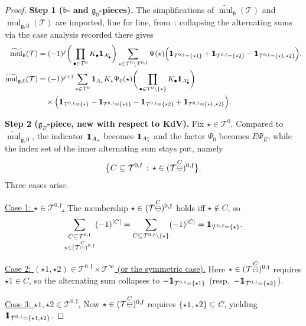 \documentclass[a4paper,
11pt,  reqno]{amsart}
\makeatletter
\newcommand{\mathbbm}[1]{\mathchoice%
    {\hbox{\sffamily 1\kern-.40em 1}}%
    {\hbox{\sffamily 1\kern-.40em 1}}%
    {\hbox{\scriptsize\sffamily 1\kern-.30em 1}}%
    {\hbox{\tiny\sffamily 1\kern-.25em 1}}}%
\newcommand{\5}{\textup{V}}
\newcommand{\ind}{\mathbbm 1}
\newcommand{\wt}{\widetilde}
\theoremstyle{remark}
\newcommand{\bul}{\bullet}
\newcommand{\TT}{\mathcal{T}}
\newcommand{\bfrak}{\mathfrak{b}}
\newcommand{\gfrak}{\mathfrak{g}}
\newcommand{\ff}{\mathfrak{f}}
\DeclareMathOperator{\mul}{mul}
\def\<#1>{\csname MH@symb@#1\endcsname}
\numberwithin{equation}{section}
\numberwithin{theorem}{section}
\makeatother
\begin{document}
\begin{proof}
\noindent\textbf{Step 1 ($\bfrak$- and $\gfrak_0$-pieces).}
The simplifications of $\wt{\mul}_\bfrak(\TT)$ and $\wt{\mul}_{\gfrak,0}(\TT)$ are imported, line for line, from~\cite[Lemma~2.10, Steps~1--2]{chcora}: collapsing the alternating sums via the case analysis recorded there gives
\begin{align}
\label{eq:mulb-nv}
\wt{\mul}_{\bfrak}(\TT) &=(-1)^j \bigg(\prod_{\bul\in \TT^0}K_\bul\ind_{A_\bul^c}\bigg) \sum_{\star\in \TT^0\setminus \TT^{0,\ff}} \Psi(\star)
\Big( \ind_{\TT^{0,\ff}=\{\star1\}} + \ind_{\TT^{0,\ff}=\{\star2\}} - \ind_{\TT^{0,\ff}=\{\star1,\star2\}}\Big),\\
\label{eq:mulg0-nv}
\wt{\mul}_{\gfrak,0}(\TT)
&= (-1)^{j+1} \sum_{\star\in \TT^0} \ind_{A_\star}K_\star\Psi_0(\star) \bigg(\prod_{\bul\in \TT^0\setminus\{\star\}}K_\bul\ind_{A_\bul^c}\bigg) \nonumber\\
&\quad \times\Big( \ind_{\TT^{0,\ff}=\{\star\}} - \ind_{\TT^{0,\ff}=\{\star1\}} - \ind_{\TT^{0,\ff}=\{\star2\}} + \ind_{\TT^{0,\ff}=\{\star1,\star2\}}\Big).
\end{align}

\medskip

\noindent\textbf{Step 2 ($\gfrak_E$-piece, new with respect to KdV).}
Fix $\star\in \TT^0$. Compared to $\wt{\mul}_{\gfrak,0}$, the indicator $\ind_{A_\star}$ becomes $\ind_{A_\star^c}$ and the factor $\Psi_0$ becomes $E\Psi_E$, while the index set of the inner alternating sum stays put, namely
\[
\big\{ C \subseteq \TT^{0,\ff} \, : \, \star \in (\TT\overset{C}{\ominus}\<1>)^{0,\ff} \big\}.
\]
Three cases arise.

\noindent\underline{Case 1: $\star\in\TT^{0,\ff}$.} The membership $\star\in (\TT\overset{C}{\ominus}\<1>)^{0,\ff}$ holds iff $\star\notin C$, so
\[
\sum_{\substack{C\subseteq \TT^{0,\ff} \\ \star\in (\TT\overset{C}{\ominus}\<1>)^{0,\ff}}} (-1)^{|C|}
= \sum_{C\subseteq \TT^{0,\ff}\setminus\{\star\}} (-1)^{|C|}
= \ind_{\TT^{0,\ff}=\{\star\}}.
\]

\noindent\underline{Case 2: $(\star1,\star2)\in\TT^{0,\ff}\times\TT^\infty$ (or the symmetric case).} Here $\star\in(\TT\overset{C}{\ominus}\<1>)^{0,\ff}$ requires $\star1\in C$, so the alternating sum collapses to $-\ind_{\TT^{0,\ff}=\{\star1\}}$ (resp.\ $-\ind_{\TT^{0,\ff}=\{\star2\}}$).

\noindent\underline{Case 3: $\star1,\star2\in\TT^{0,\ff}$.} Now $\star\in(\TT\overset{C}{\ominus}\<1>)^{0,\ff}$ requires $\{\star1,\star2\}\subseteq C$, yielding $\ind_{\TT^{0,\ff}=\{\star1,\star2\}}$.


\end{proof}
\end{document}
